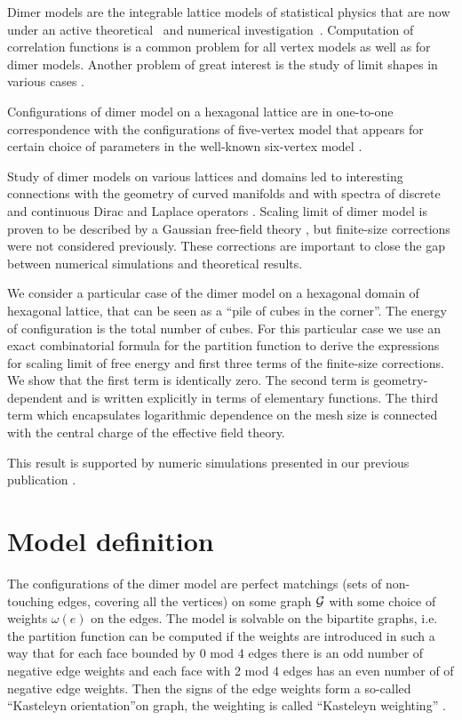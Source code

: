 \documentclass{article}
\begin{document}
Dimer models are the integrable lattice models of statistical physics that are now under an active
theoretical~\cite{zj2000,ferrari} and numerical investigation~\cite{ks2018}. Computation of
correlation functions is a common problem for all vertex models \cite{colomo2012approach} as well as
for dimer models. Another problem of great interest is the study of limit shapes in various cases
\cite{borodin2010q,di2018tangent}.

Configurations of dimer model on a hexagonal lattice are in one-to-one correspondence with the
configurations of five-vertex model that appears for certain choice of parameters in the well-known
six-vertex model \cite{kapitonov2012weighted,kapitonov2008five}.

Study of dimer models on various lattices and domains led to interesting connections with the
geometry of curved manifolds and with spectra of discrete and continuous Dirac and Laplace operators
\cite{kenyon2002laplacian,kenyon2000asymptotic}. Scaling limit of dimer model is proven to be
described by a Gaussian free-field theory \cite{kenyon2001dominos}, but finite-size corrections were
not considered previously. These corrections are important to close the gap between numerical
simulations and theoretical results.

We consider a particular case of the dimer model on a hexagonal domain of hexagonal lattice, that
can be seen as a ``pile of cubes in the corner''. The energy of configuration is the total number of
cubes. For this particular case we use an exact combinatorial formula for the partition function to
derive the expressions for scaling limit of free energy and first three terms of the finite-size
corrections. We show that the first term is identically zero. The second term is geometry-dependent
and is written explicitly in terms of elementary functions. The third term which encapsulates
logarithmic dependence on the mesh size is connected with the central charge of the effective field
theory.

This result is supported by numeric simulations presented in our previous publication
\cite{1742-6596-1135-1-012024}.

\section{Model definition}
\label{sec:model-definition}
The configurations of the dimer model are perfect matchings (sets of non-touching edges, covering
all the vertices) on some graph ${\cal G}$ with some choice of weights $\omega(e)$ on the edges. The
model is solvable on the bipartite graphs, i.e. the partition function can be computed if the
weights are introduced in such a way that for each face bounded by 0 mod 4 edges there is an odd
number of negative edge weights and each face with 2 mod 4 edges has an even number of of negative
edge weights. Then the signs of the edge weights form a so-called ``Kasteleyn orientation''on graph,
the weighting is called ``Kasteleyn weighting'' \cite{kenyon2001dominos,kenyon2009lectures}.
\end{document}
